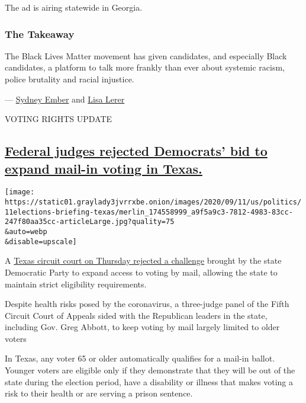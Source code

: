 The ad is airing statewide in Georgia.

\hypertarget{the-takeaway}{%
\subsubsection{The Takeaway}\label{the-takeaway}}

The Black Lives Matter movement has given candidates, and especially
Black candidates, a platform to talk more frankly than ever about
systemic racism, police brutality and racial injustice.

--- \href{https://www.nytimes3xbfgragh.onion/by/sydney-ember}{Sydney
Ember} and \href{https://www.nytimes3xbfgragh.onion/by/lisa-lerer}{Lisa
Lerer}

VOTING RIGHTS UPDATE

\hypertarget{federal-judges-rejected-democrats-bid-to-expand-mail-in-voting-in-texas}{%
\subsection{\texorpdfstring{\protect\hyperlink{federal-judges-rejected-democrats-bid-to-expand-mail-in-voting-in-texas}{Federal
judges rejected Democrats' bid to expand mail-in voting in
Texas.}}{Federal judges rejected Democrats' bid to expand mail-in voting in Texas.}}\label{federal-judges-rejected-democrats-bid-to-expand-mail-in-voting-in-texas}}

\texttt{[image: https://static01.graylady3jvrrxbe.onion/images/2020/09/11/us/politics/11elections-briefing-texas/merlin\_174558999\_a9f5a9c3-7812-4983-83cc-247f80aa35cc-articleLarge.jpg?quality=75\\\&auto=webp\\\&disable=upscale]}

A
\href{http://www.ca5.uscourts.gov/opinions/pub/20/20-50407-CV1.pdf}{Texas
circuit court on Thursday rejected a challenge} brought by the state
Democratic Party to expand access to voting by mail, allowing the state
to maintain strict eligibility requirements.

Despite health risks posed by the coronavirus, a three-judge panel of
the Fifth Circuit Court of Appeals sided with the Republican leaders in
the state, including Gov. Greg Abbott, to keep voting by mail largely
limited to older voters

In Texas, any voter 65 or older automatically qualifies for a mail-in
ballot. Younger voters are eligible only if they demonstrate that they
will be out of the state during the election period, have a disability
or illness that makes voting a risk to their health or are serving a
prison sentence.


